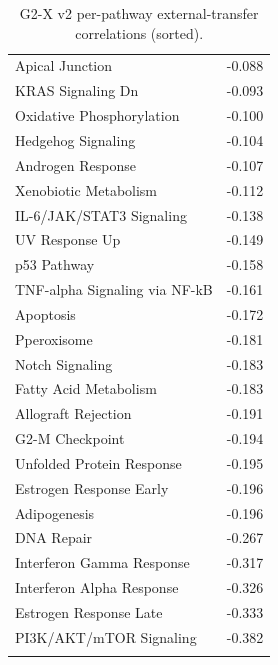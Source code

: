 \begin{longtable}{lr}
Apical Junction & -0.088\\
KRAS Signaling Dn & -0.093\\
Oxidative Phosphorylation & -0.100\\
Hedgehog Signaling & -0.104\\
Androgen Response & -0.107\\
Xenobiotic Metabolism & -0.112\\
IL-6/JAK/STAT3 Signaling & -0.138\\
UV Response Up & -0.149\\
p53 Pathway & -0.158\\
TNF-alpha Signaling via NF-kB & -0.161\\
Apoptosis & -0.172\\
Pperoxisome & -0.181\\
Notch Signaling & -0.183\\
Fatty Acid Metabolism & -0.183\\
Allograft Rejection & -0.191\\
G2-M Checkpoint & -0.194\\
Unfolded Protein Response & -0.195\\
Estrogen Response Early & -0.196\\
Adipogenesis & -0.196\\
DNA Repair & -0.267\\
Interferon Gamma Response & -0.317\\
Interferon Alpha Response & -0.326\\
Estrogen Response Late & -0.333\\
PI3K/AKT/mTOR  Signaling & -0.382\\
\hline\hline\caption{G2-X v2 per-pathway external-transfer correlations (sorted).}\label{tab:g2xperpath}\end{longtable}
